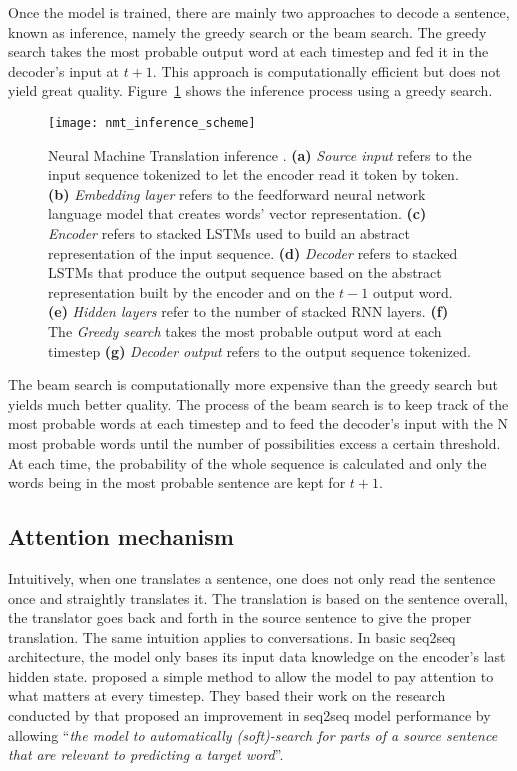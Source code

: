 Once the model is trained, there are mainly two approaches to decode a sentence, known as inference, namely the greedy search or the beam search. The greedy search takes the most probable output word at each timestep and fed it in the decoder's input at $t+1$. This approach is computationally efficient but does not yield great quality. Figure~\ref{fig:nmt-inference} shows the inference process using a greedy search.
\begin{figure}
    \centering
    \texttt{[image: nmt\_inference\_scheme]}
    \decoRule
    \caption[Neural Machine Translation inference scheme]{Neural Machine Translation inference \citep{tensorflow.nmt}. \textbf{(a)} \textit{Source input} refers to the input sequence tokenized to let the encoder read it token by token. \textbf{(b)} \textit{Embedding layer} refers to the feedforward neural network language model that creates words' vector representation. \textbf{(c)} \textit{Encoder} refers to stacked LSTMs used to build an abstract representation of the input sequence. \textbf{(d)} \textit{Decoder} refers to stacked LSTMs that produce the output sequence based on the abstract representation built by the encoder and on the $t-1$ output word. \textbf{(e)} \textit{Hidden layers} refer to the number of stacked RNN layers. \textbf{(f)} The \textit{Greedy search} takes the most probable output word at each timestep  \textbf{(g)} \textit{Decoder output} refers to the output sequence tokenized.}
    \label{fig:nmt-inference}
\end{figure}

The beam search is computationally more expensive than the greedy search but yields much better quality. The process of the beam search is to keep track of the most probable words at each timestep and to feed the decoder's input with the N most probable words until the number of possibilities excess a certain threshold. At each time, the probability of the whole sequence is calculated and only the words being in the most probable sentence are kept for $t+1$.


\subsection{Attention mechanism}
Intuitively, when one translates a sentence, one does not only read the sentence once and straightly translates it. The translation is based on the sentence overall, the translator goes back and forth in the source sentence to give the proper translation. The same intuition applies to conversations.
In basic seq2seq architecture, the model only bases its input data knowledge on the encoder's last hidden state. \citet{1508.04025} proposed a simple method to allow the model to pay attention to what matters at every timestep. They based their work on the research conducted by \citet{1409.0473} that proposed an improvement in seq2seq model performance by allowing ``\textit{the model to automatically (soft)-search for parts of a source sentence that are relevant to predicting a target word}''.

